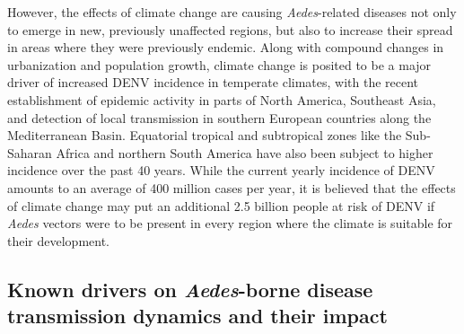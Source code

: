 \documentclass[10pt,twocolumn]{wlscirep}
\begin{document}
However, the effects of climate change are causing \textit{Aedes}-related diseases not only to emerge in new, previously unaffected regions, but also to increase their spread in areas where they were previously endemic\cite{quam_2015}. Along with compound changes in urbanization\cite{lee_2021a} and population growth\cite{struchiner_2015}, climate change is posited to be a major driver of increased DENV incidence in temperate climates\cite{kraemer_2015}, with the recent establishment of epidemic activity in parts of North America\cite{franklinos_2019}, Southeast Asia\cite{ooi_2009}, and detection of local transmission in southern European countries along the Mediterranean Basin\cite{ECDC_2024}. Equatorial tropical and subtropical zones like the Sub-Saharan Africa and northern South America have also been subject to higher incidence over the past 40 years\cite{nakase_2024}. While the current yearly incidence of DENV amounts to an average of 400 million cases per year\cite{pourzangiabadi_2025}, it is believed that the effects of climate change may put an additional 2.5 billion people at risk of DENV if \textit{Aedes} vectors were to be present in every region where the climate is suitable for their development\cite{nakase_2024}.


\subsection{Known drivers on \textit{Aedes}-borne disease transmission dynamics and their impact} \label{sec-background-aedes-borne-diseases}
\end{document}
